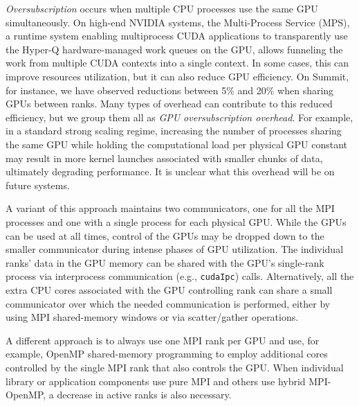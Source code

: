 \documentclass[5p,times]{elsarticle}
\begin{document}
\emph{Oversubscription} occurs when multiple CPU
processes use the same GPU simultaneously.
On high-end NVIDIA systems, the
Multi-Process Service (MPS), a runtime system enabling multiprocess
CUDA applications to transparently use the Hyper-Q hardware-managed work queues on the GPU,
allows funneling the work from multiple CUDA contexts into a single context.
In some cases, this can improve resources utilization, but it can also reduce GPU efficiency.
On Summit, for instance,
we have observed reductions between 5\% and 20\% when sharing GPUs between ranks.
Many types of overhead can contribute to this reduced efficiency,
but we group them all as {\it GPU oversubscription overhead}.
For example, in a standard strong scaling regime, increasing the number of processes sharing the same GPU
while holding the computational load per physical GPU constant may result in more kernel launches associated with smaller
chunks of data, ultimately degrading performance.
It is unclear what this overhead will be on future systems.

A variant of this approach maintains two communicators, one for all the MPI processes and one with a single process for each physical GPU.
While the GPUs can be used
at all times, control of the GPUs may be dropped down to the smaller communicator during 
intense phases of GPU utilization. The individual ranks' data in the GPU memory can be shared with the GPU's single-rank
process via interprocess communication (e.g., {\tt cudaIpc}) calls.
Alternatively, all the extra CPU cores associated with the GPU controlling rank can share a small communicator
over which the needed communication is performed,
either by using MPI shared-memory windows or via scatter/gather operations.

A different approach is to always use one MPI rank per GPU and use, for example, OpenMP
shared-memory programming to employ additional cores controlled by the single
MPI rank that also controls the GPU.
When
individual library or application components use pure MPI and others use
hybrid MPI-OpenMP, a decrease in active ranks is also necessary.
\end{document}
